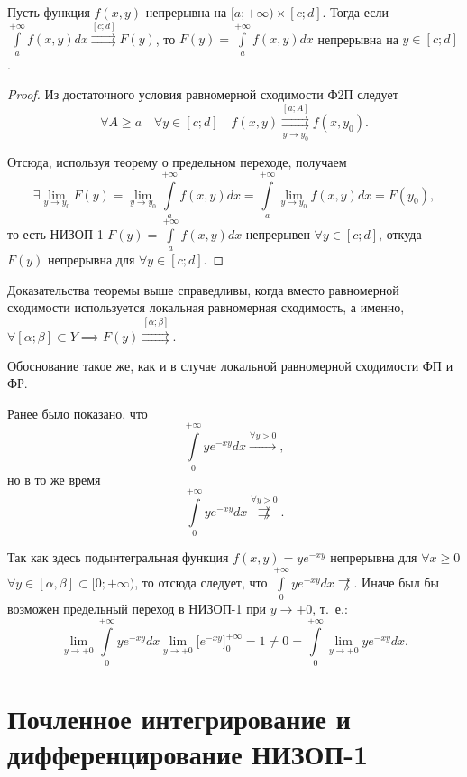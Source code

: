 \documentclass[../../main.tex]{subfiles}
\begin{document}
\begin{crl*}
Пусть функция $f(x,y)$ непрерывна на ${[a;+\infty) \times [ c; d]}$. Тогда 
если 
$\int\limits_a^{+\infty}f(x,y)dx \overset{[c;d]}\rightrightarrows F(y)$, то
$ F(y) = \int\limits_a^{+\infty}f(x,y)dx$ непрерывна на $y \in [c;d]$.
\end{crl*}

\begin{proof}
Из достаточного условия равномерной сходимости Ф2П следует \[\forall A \ge a 
\quad
\forall y \in [c;d] \quad f(x,y) \overset{[a;A]}{\underset{y \to 
y_0}{\rightrightarrows}} f(x,y_0).\]

Отсюда, используя теорему о предельном переходе, получаем
\[\exists \underset{y 
\to y_0}{\lim} F(y) = \underset{y \to y_0}\lim \int\limits_a^{+\infty}f(x,y)dx 
= \int\limits_a^{+\infty}\underset{y \to y_0}\lim f(x,y)dx = F(y_0) ,\] то 
есть 
НИЗОП-1 $F(y) = \int\limits_a^{+\infty}f(x,y)dx $ непрерывен $ \forall y \in 
[c;d]$, откуда $F(y)$ непрерывна для $ \forall y \in [c;d]$.
\end{proof}

\begin{rem}
Доказательства теоремы выше справедливы, когда вместо равномерной сходимости 
используется локальная равномерная сходимость, а именно, $\forall 
[\alpha;\beta] 
\subset Y \implies F(y) \overset{[\alpha;\beta]}{\rightrightarrows}.$

Обоснование такое же, как и в случае локальной равномерной 
сходимости ФП и ФР.
\end{rem}

\begin{exmp}
Ранее было показано, что
\[\int\limits_0^{+\infty}ye^{-xy}dx \xrightarrow{\forall y > 0},\]
но в то же время
\[\int\limits_0^{+\infty}ye^{-xy}dx \overset{\forall y > 
0}{\not\rightrightarrows}.\]

Так как здесь подынтегральная функция $f(x,y) = ye^{-xy}$ непрерывна для 
$\forall 
x \ge 0$ ${\forall y \in [\alpha,\beta] \subset [0;+\infty)}$, то
отсюда следует, что $\int\limits_0^{+\infty}ye^{-xy}dx \not\rightrightarrows$.
Иначе был бы возможен предельный переход в НИЗОП-1 при $y \to +0 $, т.~е.:
\[\underset{y \to +0}\lim\int\limits_0^{+\infty}ye^{-xy}dx \lim_{y\to+0} 
\big[e^{-xy}\big]_0^{+\infty} = 1 \ne 0 = 
\int\limits_0^{+\infty}\underset{y \to +0}\lim ye^{-xy}dx.\]
\end{exmp}

\section{Почленное интегрирование и дифференцирование НИЗОП-1}
\end{document}
